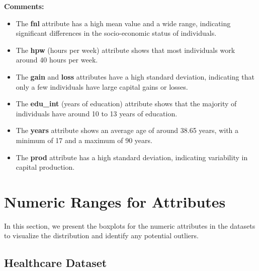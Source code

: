 \documentclass[a4paper,12pt]{article}
\begin{document}
\textbf{Comments:}
\begin{itemize}
    \item The \textbf{fnl} attribute has a high mean value and a wide range, indicating significant differences in the socio-economic status of individuals.
    \item The \textbf{hpw} (hours per week) attribute shows that most individuals work around 40 hours per week.
    \item The \textbf{gain} and \textbf{loss} attributes have a high standard deviation, indicating that only a few individuals have large capital gains or losses.
    \item The \textbf{edu\_int} (years of education) attribute shows that the majority of individuals have around 10 to 13 years of education.
    \item The \textbf{years} attribute shows an average age of around 38.65 years, with a minimum of 17 and a maximum of 90 years.
    \item The \textbf{prod} attribute has a high standard deviation, indicating variability in capital production.
\end{itemize}

\newpage

\section{Numeric Ranges for Attributes}

In this section, we present the boxplots for the numeric attributes in the datasets to visualize the distribution and identify any potential outliers.

\subsection{Healthcare Dataset}
\end{document}
